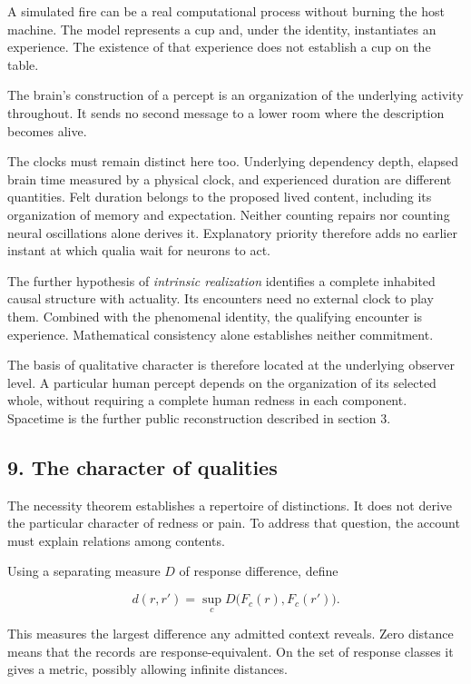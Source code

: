 \documentclass[
  11pt,
]{article}
\begin{document}
A simulated fire can be a real computational process without burning the
host machine. The model represents a cup and, under the identity,
instantiates an experience. The existence of that experience does not
establish a cup on the table.

The brain's construction of a percept is an organization of the
underlying activity throughout. It sends no second message to a lower
room where the description becomes alive.

The clocks must remain distinct here too. Underlying dependency depth,
elapsed brain time measured by a physical clock, and experienced
duration are different quantities. Felt duration belongs to the proposed
lived content, including its organization of memory and expectation.
Neither counting repairs nor counting neural oscillations alone derives
it. Explanatory priority therefore adds no earlier instant at which
qualia wait for neurons to act.

The further hypothesis of \emph{intrinsic realization} identifies a
complete inhabited causal structure with actuality. Its encounters need
no external clock to play them. Combined with the phenomenal identity,
the qualifying encounter is experience. Mathematical consistency
alone establishes neither commitment.

The basis of qualitative character is therefore located at the
underlying observer level. A particular human percept depends on the
organization of its selected whole, without requiring a complete human
redness in each component. Spacetime is the further public
reconstruction described in section 3.

\subsection{9. The character of
qualities}\label{the-character-of-qualities}

The necessity theorem establishes a repertoire of distinctions. It does
not derive the particular character of redness or pain. To address that
question, the account must explain relations among contents.

Using a separating measure \(D\) of response difference, define

\[
 d(r,r')=\sup_c D\bigl(F_c(r),F_c(r')\bigr).
\]

This measures the largest difference any admitted context reveals. Zero
distance means that the records are response-equivalent. On the set of
response classes it gives a metric, possibly allowing infinite
distances.
\end{document}
